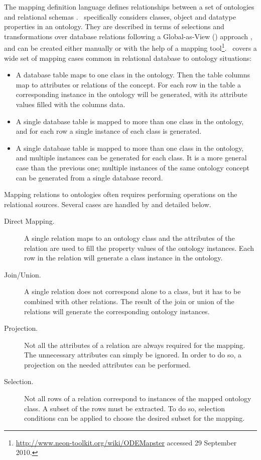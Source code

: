 The mapping definition language \rtwoo defines relationships between a set of ontologies and relational schemas \cite{Barrasa_04}.
\rtwoo\ specifically considers classes, object and datatype properties in an ontology. They are described in terms of selections and transformations over database relations following a Global-as-View (\gav) approach \cite{Lenzerini_02}, and can be created either manually or with the help of a mapping tool\footnote{\url{http://www.neon-toolkit.org/wiki/ODEMapster} accessed 29 September 2010.}.
\rtwoo\ covers a wide set of mapping cases common in relational database to ontology situations: %
\begin{itemize}
\item A database table maps to one class in the ontology. Then the table columns map to attributes or relations of the concept. For each row in the table a corresponding instance in the ontology will be generated, with its attribute values filled with the columns data.
\item A single database table is mapped to more than one class in the ontology, and for each row a single instance of each class is generated. %
\item A single database table is mapped to more than one class in the ontology, and multiple instances can be generated for each class. It is a more general case than the previous one; multiple instances of the same ontology concept can be generated from a single database record.
\end{itemize}

Mapping relations to ontologies often requires performing operations on the relational sources.
Several cases are handled by \rtwoo and detailed below.
\begin{description}
\item[Direct Mapping.] A single relation maps to an ontology class and the attributes of the relation are used to fill the property values of the ontology instances. Each row in the relation will generate a class instance in the ontology.
\item[Join/Union.] A single relation does not correspond alone to a class, but it has to be combined with other relations. The result of the join or union of the relations will generate the corresponding ontology instances.
\item[Projection.] Not all the attributes of a relation are always required for the mapping. The unnecessary attributes can simply be ignored. In order to do so, a projection on the needed attributes can be performed.
\item[Selection.] Not all rows of a relation correspond to instances of the mapped ontology class. A subset of the rows must be extracted. To do so, selection conditions can be applied to choose the desired subset for the mapping.
\end{description}

